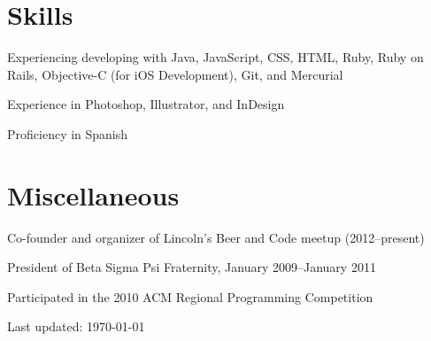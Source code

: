 \documentclass[10pt,letterpaper]{article}
\renewenvironment{itemize}{
  \begin{list}{}{
    \setlength{\leftmargin}{1.5em}
    \setlength{\itemsep}{0.25em}
    \setlength{\parskip}{0pt}
    \setlength{\parsep}{0.25em}
  }
}{
  \end{list}
}
\begin{document}

\section*{Skills}

\begin{itemize}
    \item Experiencing developing with Java, JavaScript, CSS, HTML, Ruby, Ruby on Rails,
    Objective-C (for iOS Development), Git, and Mercurial
    \item Experience in Photoshop, Illustrator, and InDesign
    \item Proficiency in Spanish
\end{itemize}

\section*{Miscellaneous}

\begin{itemize}
    \item Co-founder and organizer of Lincoln's Beer and Code meetup (2012--present)
    \item President of Beta Sigma Psi Fraternity, January 2009--January 2011
    \item Participated in the 2010 ACM Regional Programming Competition
\end{itemize}

\bigskip

\begin{center}
  \begin{small}
    Last updated: \today
  \end{small}
\end{center}
\end{document}
